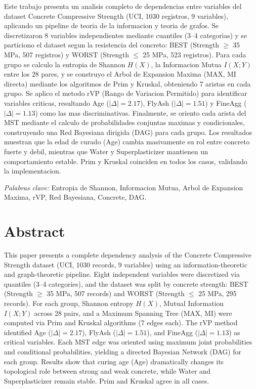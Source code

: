 \documentclass[12pt, a4paper]{article}
\begin{document}
Este trabajo presenta un analisis completo de dependencias entre variables
del dataset Concrete Compressive Strength (UCI, 1030 registros, 9 variables),
aplicando un pipeline de teoria de la informacion y teoria de grafos. Se
discretizaron 8 variables independientes mediante cuantiles (3--4 categorias)
y se particiono el dataset segun la resistencia del concreto: BEST (Strength
$\ge$ 35 MPa, 507 registros) y WORST (Strength $\le$ 25 MPa, 523 registros).
Para cada grupo se calculo la entropia de Shannon $H(X)$, la Informacion Mutua
$I(X;Y)$ entre los 28 pares, y se construyo el Arbol de Expansion Maxima (MAX,
MI directa) mediante los algoritmos de Prim y Kruskal, obteniendo 7 aristas
en cada grupo. Se aplico el metodo rVP (Rango de Variacion Permitido) para
identificar variables criticas, resultando Age ($|\Delta|=2.17$), FlyAsh
($|\Delta|=1.51$) y FineAgg ($|\Delta|=1.13$) como las mas discriminativas.
Finalmente, se oriento cada arista del MST mediante el calculo de
probabilidades conjuntas maximas y condicionales, construyendo una Red
Bayesiana dirigida (DAG) para cada grupo. Los resultados muestran que la edad
de curado (Age) cambia masivamente su rol entre concreto fuerte y debil,
mientras que Water y Superplasticizer mantienen un comportamiento estable.
Prim y Kruskal coinciden en todos los casos, validando la implementacion.

\vspace{0.5cm}
\noindent\textit{Palabras clave:} Entropia de Shannon, Informacion Mutua,
Arbol de Expansion Maxima, rVP, Red Bayesiana, Concrete, DAG.

\section*{Abstract}

This paper presents a complete dependency analysis of the Concrete Compressive
Strength dataset (UCI, 1030 records, 9 variables) using an information-theoretic
and graph-theoretic pipeline. Eight independent variables were discretized via
quantiles (3--4 categories), and the dataset was split by concrete strength:
BEST (Strength $\ge$ 35 MPa, 507 records) and WORST (Strength $\le$ 25 MPa,
295 records). For each group, Shannon entropy $H(X)$, Mutual Information
$I(X;Y)$ across 28 pairs, and a Maximum Spanning Tree (MAX, MI) were computed
via Prim and Kruskal algorithms (7 edges each). The rVP method identified Age
($|\Delta|=2.17$), FlyAsh ($|\Delta|=1.51$), and FineAgg ($|\Delta|=1.13$) as
critical variables. Each MST edge was oriented using maximum joint probabilities
and conditional probabilities, yielding a directed Bayesian Network (DAG) for
each group. Results show that curing age (Age) dramatically changes its
topological role between strong and weak concrete, while Water and
Superplasticizer remain stable. Prim and Kruskal agree in all cases.
\end{document}
